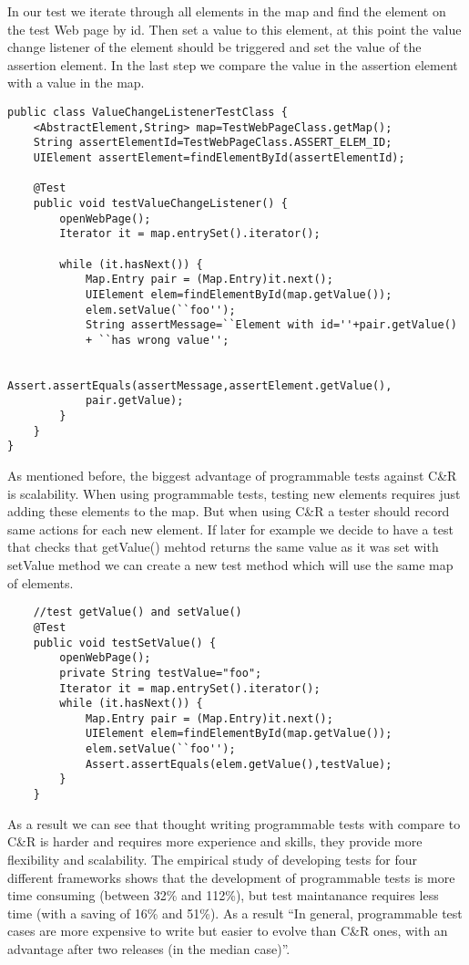       In our test we iterate through all elements in the map and find the
      element on the test Web page by id. Then set a value to this element,
      at this point the value change listener of the element should be triggered and set the value
      of the assertion element. In the last step we compare the value in the
      assertion element with a value in the map.
			
\begin{lstlisting}
public class ValueChangeListenerTestClass {
	<AbstractElement,String> map=TestWebPageClass.getMap();
	String assertElementId=TestWebPageClass.ASSERT_ELEM_ID;
	UIElement assertElement=findElementById(assertElementId);
       
    @Test
    public void testValueChangeListener() {
    	openWebPage();
        Iterator it = map.entrySet().iterator();
          
        while (it.hasNext()) {
        	Map.Entry pair = (Map.Entry)it.next();
        	UIElement elem=findElementById(map.getValue());
        	elem.setValue(``foo'');
        	String assertMessage=``Element with id=''+pair.getValue()
        	+ ``has wrong value'';
        
        	Assert.assertEquals(assertMessage,assertElement.getValue(),
        	pair.getValue);
        }
    }
}
\end{lstlisting}
  
      As mentioned before, the biggest advantage of programmable tests against
      C\&R is scalability. When using programmable tests, testing new elements
      requires just adding these elements to the map. But when using C\&R a
      tester should record same actions for each new element. If later for
      example we decide to have a test that checks that getValue() mehtod
      returns the same value as it was set with setValue method we can create
      a new test method which will use the same map of elements. 

\begin{lstlisting}
	//test getValue() and setValue()
	@Test
	public void testSetValue() {
    	openWebPage();
    	private String testValue="foo";
    	Iterator it = map.entrySet().iterator();
    	while (it.hasNext()) {
    		Map.Entry pair = (Map.Entry)it.next();
			UIElement elem=findElementById(map.getValue());
            elem.setValue(``foo'');  
            Assert.assertEquals(elem.getValue(),testValue);        
        }
    }
\end{lstlisting}

      As a result we can see that thought writing programmable tests with
      compare to C\&R is harder and requires more experience and skills, they
      provide more flexibility and scalability. The empirical study
       of developing tests for four different frameworks shows that the development of programmable tests is more time
      consuming (between 32\% and 112\%), but test maintanance requires less
      time (with a saving of 16\% and 51\%). As a result ``In general, programmable test cases are more
	expensive to write but easier to evolve than C\&R ones, with an advantage after
	two releases (in the median case)''.\cite{CaptureReplay7}

